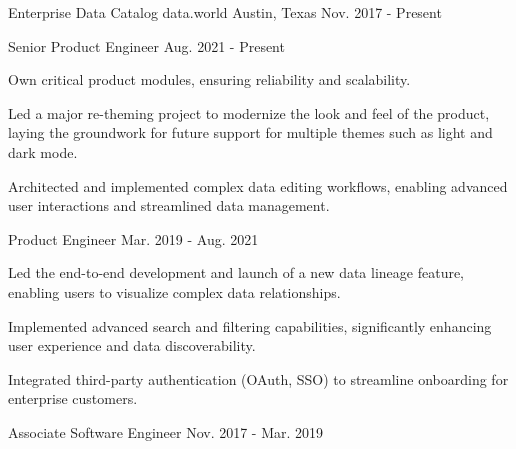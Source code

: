 


\begin{cventries}

  \cventry
    {Enterprise Data Catalog} %
    {data.world} %
    {Austin, Texas} %
    {Nov. 2017 - Present} %
    {
      \begin{cvsubentries}
       \cvsubentry
         {Senior Product Engineer}
         {Aug. 2021 - Present}
         {
          \begin{cvitems} %
            \item {Own critical product modules, ensuring reliability and scalability.}
            \item {Led a major re-theming project to modernize the look and feel of the product, laying the groundwork for future support for multiple themes such as light and dark mode.}
            \item {Architected and implemented complex data editing workflows, enabling advanced user interactions and streamlined data management.}
          \end{cvitems}
         }
       \cvsubentry
         {Product Engineer}
         {Mar. 2019 - Aug. 2021}
         {
          \begin{cvitems} %
            \item {Led the end-to-end development and launch of a new data lineage feature, enabling users to visualize complex data relationships.}
            \item {Implemented advanced search and filtering capabilities, significantly enhancing user experience and data discoverability.}
            \item {Integrated third-party authentication (OAuth, SSO) to streamline onboarding for enterprise customers.}
          \end{cvitems}
         }
       \cvsubentry
         {Associate Software Engineer}
         {Nov. 2017 - Mar. 2019}
         {
          \begin{cvitems} %

\end{cvitems}}
\end{cvsubentries}}
\end{cventries}
